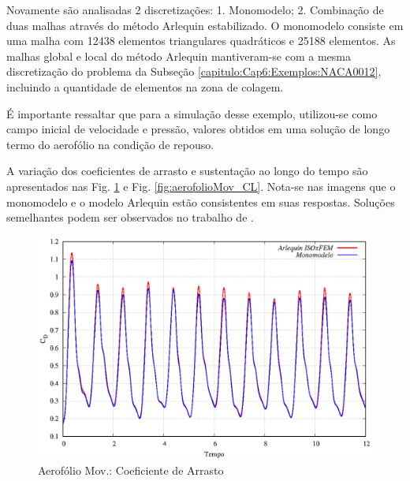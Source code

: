 \documentclass[tese_patricia]{subfiles}
\begin{document}
Novamente são analisadas 2 discretizações: 1. Monomodelo; 2. Combinação de duas malhas através do método Arlequin estabilizado.
O monomodelo consiste em uma malha com 12438 elementos triangulares quadráticos e 25188 elementos. As malhas global e local do método Arlequin mantiveram-se com a mesma discretização do problema da Subseção \ref{capitulo:Cap6:Exemplos:NACA0012}, incluindo a quantidade de elementos na zona de colagem.

É importante ressaltar que para a simulação desse exemplo, utilizou-se como campo inicial de velocidade e pressão, valores obtidos em uma solução de longo termo do aerofólio na condição de repouso.

A variação dos coeficientes de arrasto e sustentação ao longo do tempo são apresentados nas Fig. \ref{fig:aerofolioMov_CD} e Fig. \ref{fig:aerofolioMov_CL}. Nota-se nas imagens que o monomodelo e o modelo Arlequin estão consistentes em suas respostas. Soluções semelhantes podem ser observados no trabalho de .

\begin{figure}[htb!]
	\centering 
	\includegraphics[scale=1.0,trim=0cm 0cm 0cm 0cm, clip=true]{Imagens/Cap6/aerofolioMov_CD.eps}	
	\caption{Aerofólio Mov.: Coeficiente de Arrasto}
	\label{fig:aerofolioMov_CD}
\end{figure}
\end{document}
